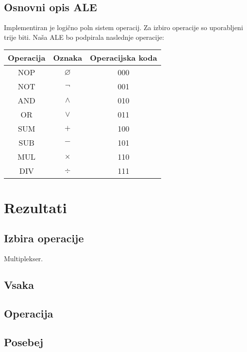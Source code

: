 \documentclass[seminar, slovene]{FRIreport}
\begin{document}
\subsection{Osnovni opis ALE}
Implementiran je logično poln sistem operacij. Za izbiro operacije so uporabljeni trije biti. Naša ALE bo podpirala naslednje operacije:

\begin{center}
\begin{tabular}{ | c | c | c | }\hline
Operacija & Oznaka & Operacijska koda \\ \hline
NOP & $\varnothing$   & 000 \\
NOT & $\lnot$ & 001 \\
AND & $\wedge$ & 010 \\
OR & $\vee$ & 011 \\
SUM & $+$ & 100 \\
SUB & $-$ & 101 \\
MUL & $\times$ & 110 \\
DIV & $\div$ & 111 \\ \hline
\end{tabular}
\end{center}

%
\section{Rezultati}
\subsection{Izbira operacije}
Multiplekser.

\subsection{Vsaka}
\subsection{Operacija}
\subsection{Posebej}
\end{document}

